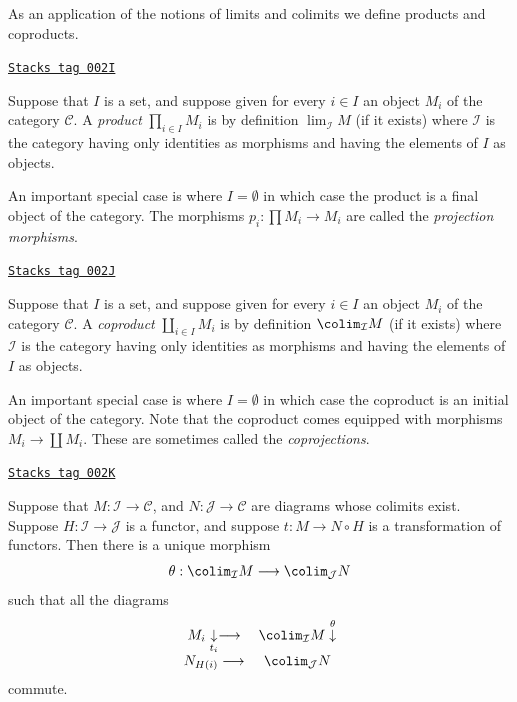 As an application of the notions of limits and colimits
we define products and coproducts.

\begin{definition}[Product]
\label{categories-definition-product}
\href{https://stacks.math.columbia.edu/tag/002I}{\texttt{Stacks tag 002I}}

Suppose that $I$ is a set, and suppose given for every $i \in I$ an
object $M_i$ of the category $\mathcal{C}$. A {\it product}
$\prod_{i\in I} M_i$ is by definition $\lim_\mathcal{I} M$
(if it exists)
where $\mathcal{I}$ is the category having only identities as
morphisms and having the elements of $I$ as objects.
\end{definition}

An important special case is where $I = \emptyset$ in which case the
product is a final object of the category.
The morphisms $p_i : \prod M_i \to M_i$ are called the
{\it projection morphisms}.

\begin{definition}[Coproduct]
\label{categories-definition-coproduct}
\href{https://stacks.math.columbia.edu/tag/002J}{\texttt{Stacks tag 002J}}

Suppose that $I$ is a set, and suppose given for every $i \in I$ an
object $M_i$ of the category $\mathcal{C}$. A {\it coproduct}
$\coprod_{i\in I} M_i$ is by definition $\colim_\mathcal{I} M$
(if it exists) where $\mathcal{I}$ is the category having only
identities as morphisms and having the elements of $I$ as objects.
\end{definition}

An important special case is where $I = \emptyset$ in which case the
coproduct is an initial object of the category.
Note that the coproduct comes equipped with morphisms
$M_i \to \coprod M_i$. These are sometimes called the
{\it coprojections}.

\begin{lemma}
\label{categories-lemma-functorial-colimit}
\href{https://stacks.math.columbia.edu/tag/002K}{\texttt{Stacks tag 002K}}

Suppose that $M : \mathcal{I} \to \mathcal{C}$,
and $N : \mathcal{J} \to \mathcal{C}$ are diagrams
whose colimits exist. Suppose
$H : \mathcal{I} \to \mathcal{J}$ is
a functor, and suppose $t : M \to N \circ H$
is a transformation of functors.
Then there is a unique morphism
$$
\theta :
\colim_\mathcal{I} M
\longrightarrow
\colim_\mathcal{J} N
$$
such that all the diagrams
$$
\begin{array}{cc}M_i \underset{t_i}{\downarrow}\longrightarrow & \colim_\mathcal{I} M \overset{\theta}{\downarrow} \\ N_{H(i)} \longrightarrow & \colim_\mathcal{J} N\end{array}
$$
commute.
\end{lemma}

